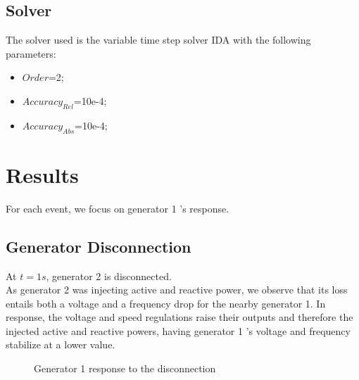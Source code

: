 \documentclass[a4paper, 12pt]{report}
\begin{document}
\subsection{Solver}
The solver used is the variable time step solver IDA with the following parameters:
\begin{itemize}
\item $Order$=2;
\item $Accuracy_{Rel}$=10e-4;
\item $Accuracy_{Abs}$=10e-4;
\end{itemize}


\newpage
\section{Results}

For each event, we focus on generator 1 's response.

\subsection{Generator Disconnection}
\label{DisconnectGenerator}

At $t=1s$, generator 2 is disconnected.\\

As generator 2 was injecting active and reactive power, we observe that its loss entails both a voltage and a frequency drop for the nearby generator 1. In response, the voltage and speed regulations raise their outputs and therefore the injected active and reactive powers, having generator 1 's voltage and frequency stabilize at a lower value.\\

\begin{figure}[H]
\caption{Generator 1 response to the disconnection}
\end{figure}
\end{document}
